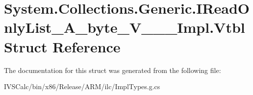 \hypertarget{struct_system_1_1_collections_1_1_generic_1_1_i_read_only_list___a__byte___v_______impl_1_1_vtbl}{}\section{System.\+Collections.\+Generic.\+I\+Read\+Only\+List\+\_\+\+A\+\_\+byte\+\_\+\+V\+\_\+\+\_\+\+\_\+\+Impl.\+Vtbl Struct Reference}
\label{struct_system_1_1_collections_1_1_generic_1_1_i_read_only_list___a__byte___v_______impl_1_1_vtbl}


The documentation for this struct was generated from the following file\+:\begin{DoxyCompactItemize}
\item 
I\+V\+S\+Calc/bin/x86/\+Release/\+A\+R\+M/ilc/Impl\+Types.\+g.\+cs\end{DoxyCompactItemize}
